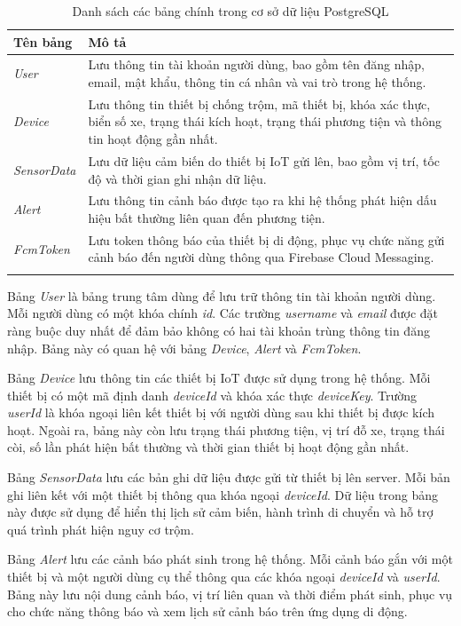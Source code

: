 \documentclass[../DoAn.tex]{subfiles}
\begin{document}
\begin{longtable}{|>{\raggedright\arraybackslash}p{3cm}|>{\raggedright\arraybackslash}p{10cm}|}
\hline
\textbf{Tên bảng} & \textbf{Mô tả} \\
\hline
\textit{User} & Lưu thông tin tài khoản người dùng, bao gồm tên đăng nhập, email, mật khẩu, thông tin cá nhân và vai trò trong hệ thống. \\
\hline
\textit{Device} & Lưu thông tin thiết bị chống trộm, mã thiết bị, khóa xác thực, biển số xe, trạng thái kích hoạt, trạng thái phương tiện và thông tin hoạt động gần nhất. \\
\hline
\textit{SensorData} & Lưu dữ liệu cảm biến do thiết bị IoT gửi lên, bao gồm vị trí, tốc độ và thời gian ghi nhận dữ liệu. \\
\hline
\textit{Alert} & Lưu thông tin cảnh báo được tạo ra khi hệ thống phát hiện dấu hiệu bất thường liên quan đến phương tiện. \\
\hline
\textit{FcmToken} & Lưu token thông báo của thiết bị di động, phục vụ chức năng gửi cảnh báo đến người dùng thông qua Firebase Cloud Messaging. \\
\hline
\caption{Danh sách các bảng chính trong cơ sở dữ liệu PostgreSQL}
\label{table:postgresql_tables}
\end{longtable}

Bảng \textit{User} là bảng trung tâm dùng để lưu trữ thông tin tài khoản người dùng. Mỗi người dùng có một khóa chính \textit{id}. Các trường \textit{username} và \textit{email} được đặt ràng buộc duy nhất để đảm bảo không có hai tài khoản trùng thông tin đăng nhập. Bảng này có quan hệ với bảng \textit{Device}, \textit{Alert} và \textit{FcmToken}.

Bảng \textit{Device} lưu thông tin các thiết bị IoT được sử dụng trong hệ thống. Mỗi thiết bị có một mã định danh \textit{deviceId} và khóa xác thực \textit{deviceKey}. Trường \textit{userId} là khóa ngoại liên kết thiết bị với người dùng sau khi thiết bị được kích hoạt. Ngoài ra, bảng này còn lưu trạng thái phương tiện, vị trí đỗ xe, trạng thái còi, số lần phát hiện bất thường và thời gian thiết bị hoạt động gần nhất.

Bảng \textit{SensorData} lưu các bản ghi dữ liệu được gửi từ thiết bị lên server. Mỗi bản ghi liên kết với một thiết bị thông qua khóa ngoại \textit{deviceId}. Dữ liệu trong bảng này được sử dụng để hiển thị lịch sử cảm biến, hành trình di chuyển và hỗ trợ quá trình phát hiện nguy cơ trộm.

Bảng \textit{Alert} lưu các cảnh báo phát sinh trong hệ thống. Mỗi cảnh báo gắn với một thiết bị và một người dùng cụ thể thông qua các khóa ngoại \textit{deviceId} và \textit{userId}. Bảng này lưu nội dung cảnh báo, vị trí liên quan và thời điểm phát sinh, phục vụ cho chức năng thông báo và xem lịch sử cảnh báo trên ứng dụng di động.
\end{document}
